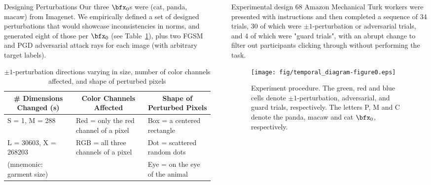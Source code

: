 \documentclass[final,notheorems]{beamer}
\newlength{\sepwidth}
\newlength{\colwidth}
\newcommand{\separatorcolumn}{\begin{column}{\sepwidth}\end{column}}
\begin{document}
\begin{frame}[t]
\begin{columns}[t]
\begin{column}{\colwidth}
    \begin{block}{Designing Perturbations}
    Our three $\bfx_0$s were (cat, panda, macaw) from Imagenet. We empirically defined a set of designed perturbations that would showcase inconsistencies in norms, and generated eight of those per $\bfx_0$ (see Table~\ref{tab:rays}), plus two FGSM and PGD adversarial attack rays for each image (with arbitrary target labels).
    \begin{table}
        \centering
          \begin{small}
            \begin{tabular}{l|l|l}
              \multicolumn{1}{c|}{\textbf{\# Dimensions Changed (s)}} & \multicolumn{1}{c|}{\textbf{Color Channels Affected}} & \multicolumn{1}{c}{\textbf{Shape of Perturbed Pixels}} \\\hline
              S = 1, M = 288 & Red = only the red channel of a pixel & Box = a centered rectangle \\
              L = 30603, X = 268203 & RGB = all three channels of a pixel & Dot = scattered random dots \\
              (mnemonic: garment size) & & Eye = on the eye of the animal \\
            \end{tabular}
          \end{small}
        \caption{$\pm1$-perturbation directions varying in size, number of color channels affected, and shape of perturbed pixels}
        \label{tab:rays}
    \end{table}

  \end{block}
\end{column}

\separatorcolumn

\begin{column}{\colwidth}

  \begin{block}{Experimental design}
    68 Amazon Mechanical Turk workers were presented with instructions and then completed a sequence of 34 trials, 30 of which were $\pm1$-perturbation or adversarial trials,
    and 4 of which were "guard trials", with an abrupt change to filter out participants clicking through without performing the task.

    \begin{figure}
      \centering
      \texttt{[image: fig/temporal\_diagram-figure0.eps]}
      \caption{Experiment procedure.
      The green, red and blue cells denote $\pm 1$-perturbation, adversarial, and guard trials, respectively.
      The letters P, M and C denote the panda, macaw and cat $\bfx_0$, respectively.
      }
      \label{fig:temporal}
    \end{figure}


\end{block}
\end{column}
\end{columns}
\end{frame}
\end{document}

